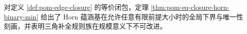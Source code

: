 \begin{remark}\label{rem:pom-horn-basis-global-min}
对定义 \ref{def:pom-edge-closure} 的等价闭包，定理 \ref{thm:pom-eq-closure-horn-binary-min} 给出了 Horn 蕴涵基在允许任意有限前提大小时的全局下界与唯一性刻画，并表明三角补全规则族在规模意义下不可改进。
\end{remark}

\endinput

